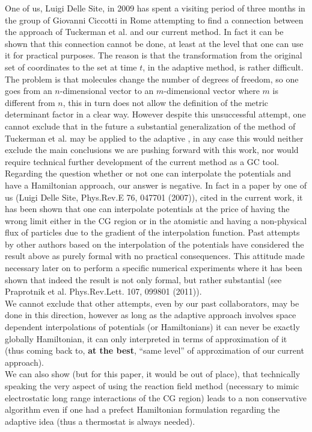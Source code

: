 \documentclass[12pt,a4paper]{article}
\begin{document}
One of us, Luigi Delle Site, in 2009 has spent a visiting period of three months in the group of Giovanni Ciccotti in Rome attempting to find a connection between the approach of
 Tuckerman et al. and our current method. In fact it can be shown that this connection cannot be done, at least at the level that one can use it for practical purposes. The reason is that the transformation from the original set of coordinates to the set at time $t$, in the adaptive method, is rather difficult. The problem is that molecules change the number of degrees of freedom, so one goes from an $n$-dimensional vector to an $m$-dimensional vector where $m$ is different from $n$, this in turn does not allow the definition of the metric determinant factor in a clear way. However despite this unsuccessful attempt, one cannot exclude that in the future a substantial generalization of the method of Tuckerman et al. may be applied to the adaptive , in any case this would neither exclude the main conclusions we are pushing forward with this work, nor would require technical further development of the current method as a GC tool.\\
Regarding the question whether or not one can interpolate the potentials and have a Hamiltonian approach, our answer is negative. In fact in a paper by one of us (Luigi Delle Site, Phys.Rev.E 76, 047701 (2007)), cited in the current work, it has been shown that one can interpolate potentials at the price of having the wrong limit either in the CG region or in the atomistic and having a non-physical flux of particles due to the gradient of the interpolation function. Past attempts by other authors based on the interpolation of the potentials have considered the result above as purely formal with no practical consequences. This attitude made necessary later on to perform a specific numerical experiments where it has been shown that indeed the result is not only formal, but rather substantial (see Praprotnik et al. Phys.Rev.Lett. 107, 099801 (2011)).\\
We cannot exclude that other attempts, even by our past collaborators, may be done in this direction, however as long as the adaptive approach involves space dependent interpolations of potentials (or Hamiltonians) it can never be exactly globally Hamiltonian, it can only interpreted in terms of approximation of it (thus coming back to, {\bf at the best}, ``same level'' of approximation of our current approach).\\
We can also show (but for this paper, it would be out of place), that technically speaking the very aspect of using the reaction field method (necessary to mimic electrostatic long range interactions of the CG region) leads to a non conservative algorithm even if one had a prefect Hamiltonian formulation regarding the adaptive idea (thus a thermostat is always needed).\\
\end{document}
